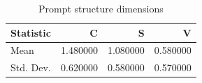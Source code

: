 \begin{table}
\caption{Prompt structure dimensions}
\label{tab:prompt-structure}
\begin{tabular}{lrrr}
\toprule
Statistic & C & S & V \\
\midrule
Mean & 1.480000 & 1.080000 & 0.580000 \\
Std. Dev. & 0.620000 & 0.580000 & 0.570000 \\
\bottomrule
\end{tabular}
\end{table}
